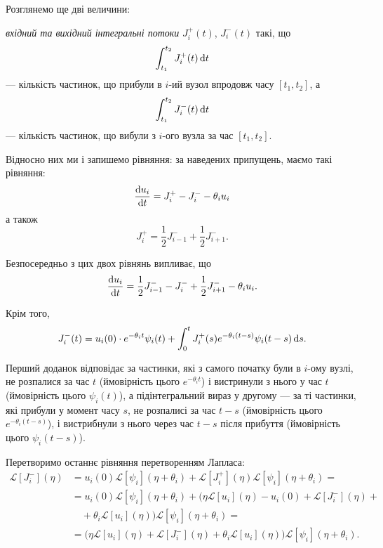 Розглянемо ще дві величини: 
\begin{definition}
    \textit{вхідний та вихідний інтегральні потоки} $J_i^+(t)$, $J_i^-(t)$ такі, що
    \begin{equation}
        \int_{t_1}^{t_2} J_i^+(t) \mathop{}\!\mathrm{d} t
    \end{equation}
    --- кількість частинок, що прибули в $i$-ий вузол впродовж часу $[t_1, t_2]$, а
    \begin{equation}
        \int_{t_1}^{t_2} J_i^-(t) \mathop{}\!\mathrm{d} t
    \end{equation}
    --- кількість частинок, що вибули з $i$-ого вузла за час $[t_1, t_2]$.
\end{definition}

Відносно них ми і запишемо рівняння: за наведених припущень, маємо такі рівняння:
\begin{equation}
    \frac{\mathop{}\!\mathrm{d} u_i}{\mathop{}\!\mathrm{d} t} = J_i^+ - J_i^- - \theta_i u_i
\end{equation}
а також
\begin{equation}
    J_i^+ = \frac{1}{2} J_{i - 1}^- + \frac{1}{2} J_{i + 1}^-.
\end{equation}

Безпосередньо з цих двох рівнянь випливає, що
\begin{equation}
    \frac{\mathop{}\!\mathrm{d} u_i}{\mathop{}\!\mathrm{d} t} = \frac{1}{2} J_{i - 1}^- - J_i^- + \frac{1}{2} J_{i + 1}^- - \theta_i u_i.
\end{equation}

Крім того,
\begin{equation}
    J_i^-(t) = u_i(0) \cdot e^{-\theta_i t} \psi_i(t) + \int_0^t J_i^+(s) e^{-\theta_i (t - s)} \psi_i(t - s) \mathop{}\!\mathrm{d} s.
\end{equation}

Перший доданок відповідає за частинки, які з самого початку були в $i$-ому вузлі, не розпалися за час $t$ (ймовірність цього $e^{-\theta_i t}$) і вистринули з нього у час $t$ (ймовірність цього $\psi_i(t)$), а підінтегральний вираз у другому --- за  ті частинки, які прибули у момент часу $s$, не розпалисі за час $t - s$ (ймовірність цього $e^{-\theta_i (t - s)}$), і вистрибнули з нього через час $t - s$ після прибуття (ймовірність цього $\psi_i(t - s)$). \medskip

Перетворимо останнє рівняння перетворенням Лапласа:
\begin{equation}
    \begin{aligned}
        \mathcal{L} [J_i^-](\eta)
        &= u_i(0) \mathcal{L}[\psi_i](\eta + \theta_i) + \mathcal{L} [J_i^+](\eta) \mathcal{L}[\psi_i](\eta + \theta_i) = \\
        &= u_i(0) \mathcal{L}[\psi_i](\eta + \theta_i) + \big( \eta \mathcal{L} [u_i](\eta) - u_i(0) + \mathcal{L}[J_i^-](\eta) + \\
        &\quad + \theta_i \mathcal{L}[u_i](\eta) \big) \mathcal{L}[\psi_i](\eta + \theta_i) = \\
        &= \big( \eta \mathcal{L} [u_i](\eta) + \mathcal{L}[J_i^-](\eta) + \theta_i \mathcal{L}[u_i](\eta) \big) \mathcal{L}[\psi_i](\eta + \theta_i).
    \end{aligned}
\end{equation}

